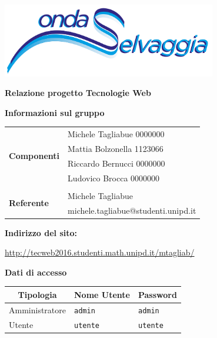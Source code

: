 

	
 	\begin{titlepage} 
 		\centering
 		\includegraphics[width=0.70\textwidth]{images/new_logo_min.png}\par\vspace{1cm}
 		{\LARGE\textbf{Relazione progetto Tecnologie Web}}\vspace{2cm}
 		
 		{\large\textbf{Informazioni sul gruppo}}\vspace{0.5cm}
 	
 		\begin{tabular}{l | l@{}}
 			\multirow{4}{*}{\textbf{Componenti}}&Michele Tagliabue 0000000\\
 		
 			&Mattia Bolzonella 1123066\\
 			&Riccardo Bernucci 0000000\\
 			&Ludovico Brocca 0000000\\
 			&\\
 			\multirow{2}{*}{\textbf{Referente}}&Michele Tagliabue\\
 			&michele.tagliabue@studenti.unipd.it\\
 		\end{tabular}\vspace{1.2cm}
 	 		
 	 	{\large\textbf{Indirizzo del sito: }}
 	 
 		{\large \url{http://tecweb2016.studenti.math.unipd.it/mtagliab/}}
 		\vspace{2cm}
 		
 		\textbf{Dati di accesso}
 	
 		\begin{tabular}{| l | l | l |}	
 			\hline
 			\multicolumn{1}{|c|}{\bfseries Tipologia} & \multicolumn{1}{c}{\bfseries Nome Utente} & \multicolumn{1}{|c|}{\bfseries Password} \\
 			\hline
 			Amministratore&\texttt{admin}&\texttt{admin}\\
 			Utente&\texttt{utente}&\texttt{utente}\\
 			\hline
 		\end{tabular}
	\end{titlepage}
	\newpage
	\tableofcontents
	
